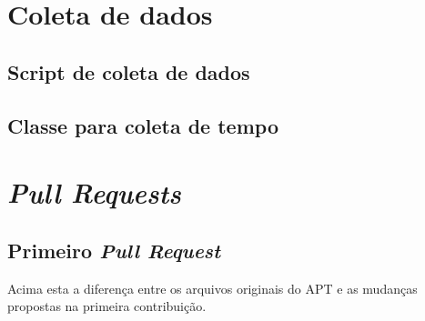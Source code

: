 \begin{apendicesenv}

\partapendices

\chapter{Coleta de dados} %
\label{cha:coleta_de_dados}

\section{Script de coleta de dados}
	

\section{Classe para coleta de tempo}
	


\chapter{\textit{Pull Requests}}
\label{cha:pull_requests}

\section{Primeiro \textit{Pull Request}}
\label{sec:primeiro_pr}
	

Acima esta a diferença entre os arquivos originais do APT e as mudanças propostas na primeira contribuição.



\end{apendicesenv}
